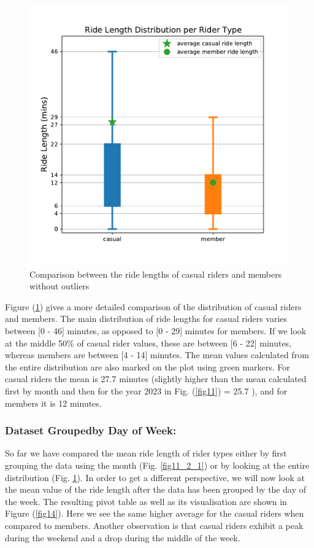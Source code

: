 \documentclass[12pt]{article}
\begin{document}
	\begin{figure}[h]
	\centering
	\includegraphics[scale=0.6]{ridelength_boxplot_wo_outliers.pdf} 
	\caption{Comparison between the ride lengths of casual riders and members without outliers}
	\label{fig15}
	\end{figure}

Figure (\underline{\ref{fig15}}) gives a more detailed comparison of the distribution of casual riders and members. The main distribution of ride lengths for casual riders varies between [0 - 46] minutes, as opposed to [0 - 29] minutes for members. If we look at the middle 50\% of casual rider values, these are between [6 - 22] minutes, whereas members are between [4 - 14] minutes. The mean values calculated from the entire distribution are also marked on the plot using green markers. For casual riders the mean is 27.7 minutes (slightly higher than the mean calculated first by month and then for the year 2023 in Fig. (\underline{\ref{fig11}}) = 25.7 ), and for members it is 12 minutes.  

\pagebreak
\subsubsection*{Dataset Groupedby Day of Week:}
So far we have compared the mean ride length of rider types either by first grouping the data using the month (Fig. \underline{\ref{fig11_2_1}}) or by looking at the entire distribution (Fig. \underline{\ref{fig15}}). In order to get a different perspective, we will now look at the mean value of the ride length after the data has been grouped by the day of the week. The resulting pivot table as well as its visualisation are shown in Figure (\underline{\ref{fig14}}). Here we see the same higher average for the casual riders when compared to members. Another observation is that casual riders exhibit a peak during the weekend and a drop during the middle of the week. 
	
\end{document}
